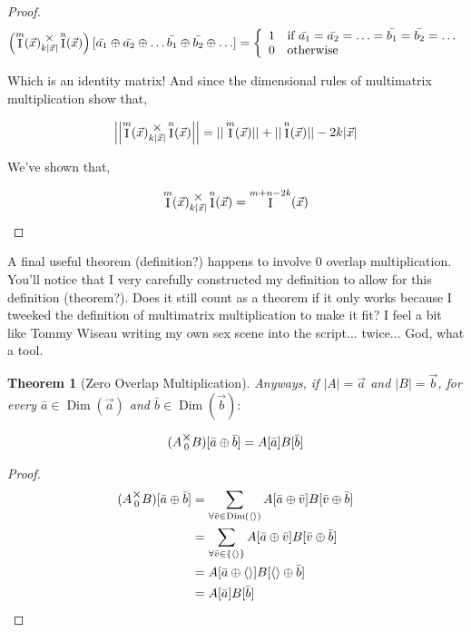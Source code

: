 \documentclass[12pt]{book}
\theoremstyle{plain}
\newtheorem{theorem}{Theorem}[chapter]
\theoremstyle{definition}
\theoremstyle{ppart}
\theoremstyle{case}
\theoremstyle{solution}
\DeclareMathOperator{\Dim}{Dim}
\DeclareMathOperator{\Ident}{I}
\newcommand{\mmult}[1]{\text{\raisebox{1ex}{$\underset{#1}{\times}$}}}
\begin{document}
\begin{landscape}
\begin{proof}
\begin{align*}
\left( \Ident^m(\vec{x}) \mmult{k|\vec{x}|} \Ident^n(\vec{x}) \right)
[\bar{a_1} \oplus \bar{a_2} \oplus \ldots \bar{b_1} \oplus \bar{b_2} \oplus \ldots] =
\left\{
  \begin{array}{ll}
    1 & \mbox{if } \bar{a_1} = \bar{a_2} = \ldots = \bar{b_1} = \bar{b_2} = \ldots \\
    0 & \mbox{otherwise}
  \end{array}
\right.
\end{align*} 

Which is an identity matrix! And since the dimensional rules of multimatrix 
multiplication show that,

\[
 \left|\left| \Ident^m(\vec{x}) \mmult{k|\vec{x}|} \Ident^n(\vec{x}) \right|\right|
 =
 ||\Ident^m(\vec{x})|| + ||\Ident^n(\vec{x})|| - 2k|\vec{x}|
\]

We've shown that,

\[ \Ident^m(\vec{x}) \mmult{k|\vec{x}|} \Ident^n(\vec{x}) = \Ident^{m+n-2k}(\vec{x}) \]
\end{proof}
\end{landscape}

A final useful theorem (definition?) happens to involve 0 overlap multiplication.
You'll notice that I very carefully constructed my definition to allow for this
definition (theorem?). Does it still count as a theorem if it only works because
I tweeked the definition of multimatrix multiplication to make it fit? I feel
a bit like Tommy Wiseau writing my own sex scene into the script... twice... God,
what a tool.

\begin{theorem}[Zero Overlap Multiplication]
Anyways, if $|A| = \vec{a}$ and $|B| = \vec{b}$, for every $\bar{a} \in \Dim(\vec{a})$
and $\bar{b} \in \Dim(\vec{b}):$

\[ (A \mmult{0} B)[\bar{a} \oplus \bar{b}] = A[\bar{a}] B[\bar{b}] \]

\end{theorem}
\begin{proof}
\begin{align*}
	(A \mmult{0} B)[\bar{a} \oplus \bar{b}]
	&=
	\sum_{\forall \bar{v} \in \Dim(\left<\right>)}
	A[\bar{a} \oplus \bar{v}] B[\bar{v} \oplus \bar{b}] \\
	&=
	\sum_{\forall \bar{v} \in \left\{\left<\right>\right\}}
	A[\bar{a} \oplus \bar{v}] B[\bar{v} \oplus \bar{b}] \\
	&=
	A[\bar{a} \oplus \left<\right>] B[\left<\right> \oplus \bar{b}] \\
	&=
	A[\bar{a}] B[\bar{b}] \\
\end{align*}
\end{proof}
\end{document}
